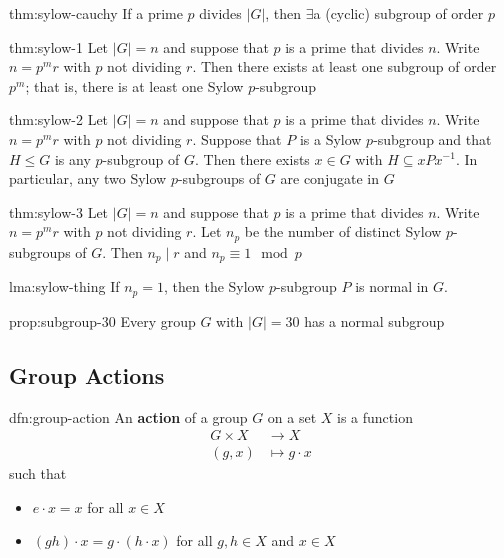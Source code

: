 \documentclass{article}
\begin{document}
\begin{thm}[Cauchy]{thm:sylow-cauchy}{}
    If a prime $p$ divides $\lvert G \rvert$, then $\exists$a (cyclic) subgroup of order $p$
\end{thm}

\begin{thm}[Sylow I]{thm:sylow-1}{}
    Let $\lvert G \rvert = n$ and suppose that $p$ is a prime that divides $n$. Write $n = p^{m}r$ with $p$ not dividing $r$. Then there exists at least one subgroup of order $p^{m}$; that is, there is at least one Sylow $p$-subgroup
\end{thm}

\begin{thm}[Sylow II]{thm:sylow-2}{}
    Let $\lvert G \rvert = n$ and suppose that $p$ is a prime that divides $n$. Write $n = p^{m}r$ with $p$ not dividing $r$. Suppose that $P$ is a Sylow $p$-subgroup and that $H \le G$ is any $p$-subgroup of $G$. Then there exists $x\in G$ with $H \subseteq xPx^{-1}$. In particular, any two Sylow $p$-subgroups of $G$ are conjugate in $G$
\end{thm}

\begin{thm}{thm:sylow-3}{}
    Let $\lvert G \rvert = n$ and suppose that $p$ is a prime that divides $n$. Write $n = p^{m}r$ with $p$ not dividing $r$. Let $n_{p}$ be the number of distinct Sylow $p$-subgroups of $G$. Then $n_{p}\mid r$ and $n_{p} \equiv 1 \mod p$
\end{thm}

\begin{lma}[]{lma:sylow-thing}{}
    If $n_{p} = 1$, then the Sylow $p$-subgroup $P$ is normal in $G$.
\end{lma}

\begin{ppn}[]{prop:subgroup-30}{}
    Every group $G$ with $\lvert G \rvert = 30$ has a normal subgroup
\end{ppn}

\subsection{Group Actions}

\begin{dfn}{dfn:group-action}{}
    An \textbf{action} of a group $G$ on a set $X$ is a function
    \begin{align*}
        G \times X &\to X\\
        (g,x) &\mapsto g \cdot x
    \end{align*}
    such that
    \begin{itemize}
        \item $e \cdot x = x$ for all $x\in X$
        \item $(gh) \cdot x = g \cdot (h \cdot x)$ for all $g,h\in X$ and $x\in X$
    \end{itemize}
\end{dfn}
\end{document}
